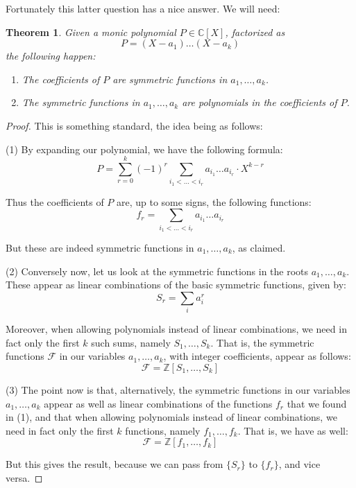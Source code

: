 \documentclass[12pt]{amsbook}
\newtheorem{theorem}{Theorem}[chapter]
\begin{document}
\bigskip

Fortunately this latter question has a nice answer. We will need:


\begin{theorem}
Given a monic polynomial $P\in\mathbb C[X]$, factorized as
$$P=(X-a_1)\ldots(X-a_k)$$
the following happen:
\begin{enumerate}
\item The coefficients of $P$ are symmetric functions in $a_1,\ldots,a_k$.

\item The symmetric functions in $a_1,\ldots,a_k$ are polynomials in the coefficients of $P$.
\end{enumerate}
\end{theorem}

\begin{proof}
This is something standard, the idea being as follows:

\medskip

(1) By expanding our polynomial, we have the following formula:
$$P=\sum_{r=0}^k(-1)^r\sum_{i_1<\ldots<i_r}a_{i_1}\ldots a_{i_r}\cdot X^{k-r}$$

Thus the coefficients of $P$ are, up to some signs, the following functions:
$$f_r=\sum_{i_1<\ldots<i_r}a_{i_1}\ldots a_{i_r}$$

But these are indeed symmetric functions in $a_1,\ldots,a_k$, as claimed. 

\medskip

(2) Conversely now, let us look at the symmetric functions in the roots $a_1,\ldots,a_k$. These appear as linear combinations of the basic symmetric functions, given by:
$$S_r=\sum_ia_i^r$$

Moreover, when allowing polynomials instead of linear combinations, we need in fact only the first $k$ such sums, namely $S_1,\ldots,S_k$. That is, the symmetric functions $\mathcal F$ in our variables $a_1,\ldots,a_k$, with integer coefficients, appear as follows:
$$\mathcal F=\mathbb Z[S_1,\ldots,S_k]$$ 

(3) The point now is that, alternatively, the symmetric functions in our variables $a_1,\ldots,a_k$ appear as well as linear combinations of the functions $f_r$ that we found in (1), and that when allowing polynomials instead of linear combinations, we need in fact only the first $k$ functions, namely $f_1,\ldots,f_k$. That is, we have as well:
$$\mathcal F=\mathbb Z[f_1,\ldots,f_k]$$

But this gives the result, because we can pass from $\{S_r\}$ to $\{f_r\}$, and vice versa.
\end{proof}
\end{document}
